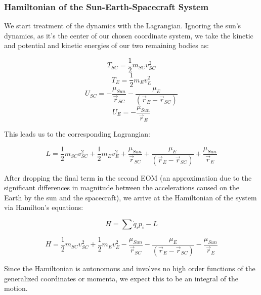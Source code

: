 \documentclass[11pt,twoside,letterpaper]{article}
\begin{document}
  \subsubsection {Hamiltonian of the Sun-Earth-Spacecraft System}
  We start treatment of the dynamics with the Lagrangian. Ignoring the
  sun's dynamics, as it's the center of our chosen
  coordinate system, we take the kinetic and potential and kinetic
  energies of our two remaining bodies as:

  \begin {equation}
    T_{SC} = \frac{1}{2}m_{SC}v^2_{SC}
  \end {equation}
  \begin {equation}
    T_E = \frac{1}{2}m_Ev^2_E
  \end {equation}
  \begin {equation}
    U_{SC} = -\frac{\mu_{Sun}}{\vec{r}_{SC}} - \frac{\mu_E}{\left(\vec{r}_E - \vec{r}_{SC}\right)}
  \end {equation}
  \begin {equation}
    U_E = -\frac{\mu_{Sun}}{\vec{r}_{E}}
  \end {equation}

  This leads us to the corresponding Lagrangian:

  \begin {equation}
    L = \frac{1}{2}m_{SC}v^2_{SC} + \frac{1}{2}m_Ev^2_E
    + \frac{\mu_{Sun}}{\vec{r}_{SC}} + \frac{\mu_E}{\left(\vec{r}_E - \vec{r}_{SC}\right)}
     + \frac{\mu_{Sun}}{\vec{r}_{E}}
  \end {equation}
  
  After dropping the final term in the second EOM (an approximation
  due to the significant differences in magnitude between the
  accelerations caused on the Earth by the sun and the spacecraft), we
  arrive at the Hamiltonian of the system via Hamilton's equations:

  \begin {equation}
    H = \sum{\dot{q}_ip_i} - L
  \end {equation}
  
  \begin {equation}
    H = \frac{1}{2}m_{SC}v^2_{SC} + \frac{1}{2}m_Ev^2_E
    - \frac{\mu_{Sun}}{\vec{r}_{SC}} - \frac{\mu_E}{\left(\vec{r}_E - \vec{r}_{SC}\right)}
    - \frac{\mu_{Sun}}{\vec{r}_{E}}
  \end {equation}
    
  Since the Hamiltonian is autonomous and involves no high order
  functions of the generalized coordinates or momenta, we expect this
  to be an integral of the motion.
  
\end{document}

